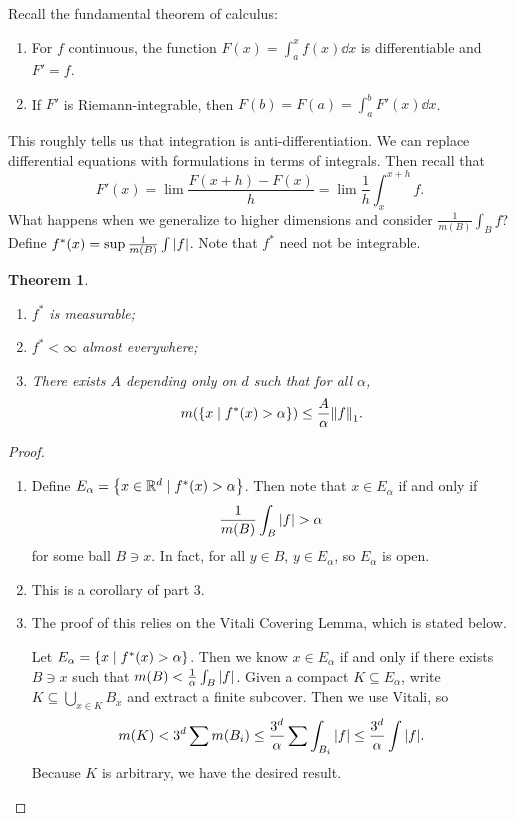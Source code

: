 \documentclass[leqno, openany]{memoir}
\newtheorem{thm}{Theorem}[chapter]
\theoremstyle{definition}
\theoremstyle{remark}
\theoremstyle{plain}
\theoremstyle{definition}
\theoremstyle{remark}
\newcommand{\R}{\mathbb{R}}
\begin{document}
Recall the fundamental theorem of calculus: \begin{enumerate} \item For $f$
    continuous, the function $F(x) = \int_a^x f(x) \dd{x}$ is differentiable
    and $F' = f$.  \item If $F'$ is Riemann-integrable, then $F(b) = F(a) =
    \int_a^b F'(x) \dd{x}$.  \end{enumerate}

This roughly tells us that integration is anti-differentiation. We can replace
differential equations with formulations in terms of integrals. Then recall
that \[ F'(x) = \lim \frac{F(x+h) - F(x)}{h} = \lim \frac{1}{h} \int_x^{x+h} f.
\] What happens when we generalize to higher dimensions and consider
$\frac{1}{m(B)} \int_B f$? Define $f^*(x) = \sup \frac{1}{m(B)} \int \abs{f}$.
Note that $f^*$ need not be integrable.

\begin{thm} \begin{enumerate} \item $f^*$ is measurable; \item $f^* < \infty$
    almost everywhere; \item There exists $A$ depending only on $d$ such that
    for all $\alpha$, \[ m \qty(\qty{x \mid f^*(x) > \alpha}) \leq
    \frac{A}{\alpha} \norm{f}_1. \] \end{enumerate} \end{thm}

\begin{proof} \begin{enumerate} \item Define $E_{\alpha} = \qty{x \in \R^d \mid
    f^*(x) > \alpha}$. Then note that $x \in E_{\alpha}$ if and only if \[
    \frac{1}{m(B)} \int_B \abs{f} > \alpha \] for some ball $B \ni x$. In fact,
    for all $y \in B$, $y \in E_{\alpha}$, so $E_{\alpha}$ is open.  \item This
    is a corollary of part 3.  \item The proof of this relies on the Vitali
    Covering Lemma, which is stated below.
            
            Let $E_{\alpha} = \qty{x \mid f^*(x) > \alpha}$. Then we know $x
            \in E_{\alpha}$ if and only if there exists $B \ni x$ such that
            $m(B) < \frac{1}{\alpha} \int_B \abs{f}$. Given a compact $K
            \subseteq E_{\alpha}$, write $K \subseteq \bigcup_{x \in K} B_x$
            and extract a finite subcover. Then we use Vitali, so \[ m(K) < 3^d
            \sum m(B_{i}) \leq \frac{3^d}{\alpha} \sum \int_{B_{i}} \abs{f}
        \leq \frac{3^d}{\alpha} \int \abs{f}. \] Because $K$ is arbitrary, we
have the desired result.  \end{enumerate} \end{proof}
\end{document}
